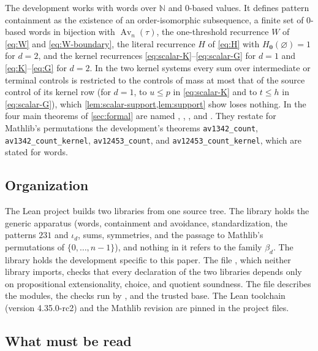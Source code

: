 \documentclass[11pt,reqno]{amsart}
\theoremstyle{definition}
\theoremstyle{remark}
\newcommand{\Av}{\operatorname{Av}}
\begin{document}
The development works with words over $\mathbb N$ and $0$-based values.  It
defines pattern containment as the existence of an order-isomorphic
subsequence, a finite set of $0$-based words in bijection with $\Av_n(\tau)$,
the one-threshold recurrence $W$ of
\eqref{eq:W} and \eqref{eq:W-boundary}, the literal recurrence $H$ of
\eqref{eq:H} with $H_{\mathbf0}(\varnothing)=1$ for $d=2$, and the
kernel recurrences \eqref{eq:scalar-K}--\eqref{eq:scalar-G} for $d=1$ and
\eqref{eq:K}--\eqref{eq:G} for $d=2$.  In the two kernel systems every sum
over intermediate or terminal controls is restricted to the controls of mass
at most that of the source control of its kernel row (for $d=1$, to
$u\leq p$ in \eqref{eq:scalar-K} and to $t\leq h$ in \eqref{eq:scalar-G}),
which \cref{lem:scalar-support,lem:support} show loses nothing.
In  the four main theorems of \cref{sec:formal} are
named ,
, ,
and .  They restate for Mathlib's
permutations the development's theorems \texttt{av1342\_count},
\texttt{av1342\_count\_kernel}, \texttt{av12453\_count}, and
\texttt{av12453\_count\_kernel}, which are stated for words.

\subsection{Organization}

The Lean project  builds two libraries from one
source tree.  The library  holds the generic apparatus
(words, containment and avoidance, standardization, the patterns $231$ and
$\iota_d$, sums, symmetries, and the passage to Mathlib's permutations of
$\{0,\ldots,n-1\}$), and nothing in it refers to the family $\beta_d$.  The
library  holds the development specific to this paper.  The
file , which neither library imports, checks that
every declaration of the two libraries depends only on propositional extensionality, choice, and quotient
soundness.  The file  describes the modules, the
checks run by , and the trusted base.  The
Lean toolchain (version 4.35.0-rc2) and the Mathlib revision are pinned in
the project files.

\subsection{What must be read}
\end{document}

